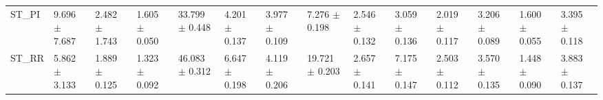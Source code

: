 \begin{tabular}{llllllllllllll}
ST_PI     &   9.696 $ \pm $ 7.687 &  2.482 $ \pm $ 1.743 &  1.605 $ \pm $ 0.050 &  33.799 $ \pm $ 0.448 &   4.201 $ \pm $ 0.137 &   3.977 $ \pm $ 0.109 &   7.276 $ \pm $ 0.198 &   2.546 $ \pm $ 0.132 &   3.059 $ \pm $ 0.136 &  2.019 $ \pm $ 0.117 &   3.206 $ \pm $ 0.089 &  1.600 $ \pm $ 0.055 &   3.395 $ \pm $ 0.118 \\
ST_RR     &   5.862 $ \pm $ 3.133 &  1.889 $ \pm $ 0.125 &  1.323 $ \pm $ 0.092 &  46.083 $ \pm $ 0.312 &   6.647 $ \pm $ 0.198 &   4.119 $ \pm $ 0.206 &  19.721 $ \pm $ 0.203 &   2.657 $ \pm $ 0.141 &   7.175 $ \pm $ 0.147 &  2.503 $ \pm $ 0.112 &   3.570 $ \pm $ 0.135 &  1.448 $ \pm $ 0.090 &   3.883 $ \pm $ 0.137 \\
\bottomrule
\end{tabular}
